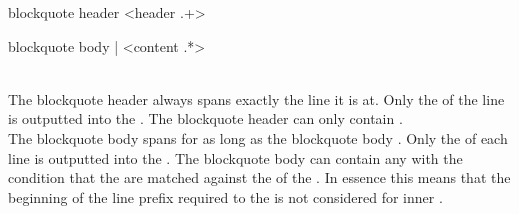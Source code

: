 \begin{identifier}{blockquote header}
\* <header .+>
\end{identifier}
\begin{identifier}{blockquote body}
| <content .*>
\end{identifier}
 \\

The blockquote header always spans exactly the line it is  at. Only the  of the line is outputted into the . The blockquote header can only contain . \\

The blockquote body spans for as long as the blockquote body  . Only the  of each line is outputted into the . The blockquote body can contain any  with the condition that the  are matched against the  of the . In essence this means that the beginning of the line prefix required to  the  is not considered for inner .

